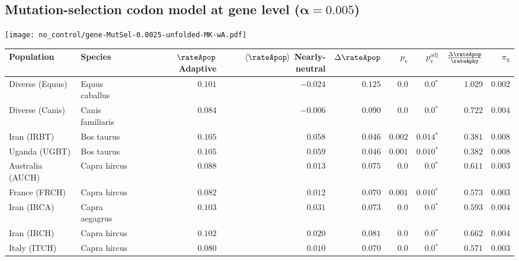 \subsection{Mutation-selection codon model at gene level ($\bm{\alpha=0.005}$)}
\begin{center}
    \texttt{[image: no\_control/gene-MutSel-0.0025-unfolded-MK-wA.pdf]}
    \begin{adjustbox}{width = 1\textwidth}
        \begin{tabular}{|l|l|r|r|r|r|r|r|r|}
            \toprule
            Population & Species & \specialcell{$\rateApop$ \\ Adaptive}                & \specialcell{$\left< \rateApop \right>$ \\ Nearly-neutral}                & $\Delta \rateApop $    & $p_{\mathrm{v}}$ & $p_{\mathrm{v}}^{\mathrm{adj}}$ & $\frac{\Delta\rateApop}{\rateAphy}$ & $\pi_{\textrm{S}}$    \\
            \midrule
            Diverse (Equus)                    & Equus caballus          & $ 0.101$ & $-0.024$ & $ 0.125$ & $0.0$ & $\bm{0.0{^*}}$ & $ 1.029$ & $ 0.002$ \\
            Diverse (Canis)                  & Canis familiaris          & $ 0.084$ & $-0.006$ & $ 0.090$ & $0.0$ & $\bm{0.0{^*}}$ & $ 0.722$ & $ 0.004$ \\
            Iran (IRBT)               & Bos taurus        & $ 0.105$ & $ 0.058$ & $ 0.046$ & $ 0.002$    & $\bm{ 0.014{^*}}$    & $ 0.381$ & $ 0.008$ \\
            Uganda (UGBT)                  & Bos taurus        & $ 0.105$ & $ 0.059$ & $ 0.046$ & $ 0.001$ & $\bm{ 0.010{^*}}$ & $ 0.382$ & $ 0.008$ \\
            Australia (AUCH)                    & Capra hircus      & $ 0.088$ & $ 0.013$ & $ 0.075$ & $0.0$    & $\bm{0.0{^*}}$    & $ 0.611$ & $ 0.003$ \\
            France (FRCH)                    & Capra hircus        & $ 0.082$ & $ 0.012$ & $ 0.070$ & $ 0.001$    & $\bm{ 0.010{^*}}$    & $ 0.573$ & $ 0.003$ \\
            Iran (IRCA)                   & Capra aegagrus        & $ 0.103$ & $ 0.031$ & $ 0.073$ & $0.0$    & $\bm{0.0{^*}}$    & $ 0.593$ & $ 0.004$ \\
            Iran (IRCH)                 & Capra hircus        & $ 0.102$ & $ 0.020$ & $ 0.081$ & $0.0$    & $\bm{0.0{^*}}$    & $ 0.662$ & $ 0.004$ \\
            Italy (ITCH)                    & Capra hircus          & $ 0.080$ & $ 0.010$ & $ 0.070$ & $0.0$    & $\bm{0.0{^*}}$    & $ 0.571$ & $ 0.003$ \\

\end{tabular}
\end{adjustbox}
\end{center}
